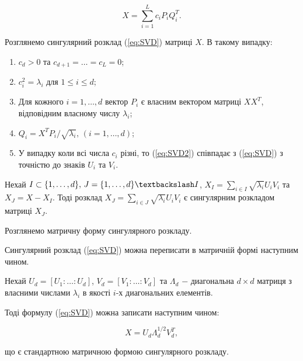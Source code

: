 \begin{equation}\label{eq:SVD2}
X = \sum_{i=1}^{L}c_{i}P_{i}Q_{i}^{T}.
\end{equation}

\vspace{1.5em}

Розглянемо сингулярний розклад (\ref{eq:SVD}) матриці $X$. В такому випадку:

\begin{enumerate}
	\item $c_{d} > 0$ та $c_{d+1} = \dots = c_{L} = 0$;
	\item $c_{i}^{2} = \lambda_{i}$ для $1 \le i \le d$;
	\item Для кожного $i = 1, \dots, d$ вектор $P_{i}$ є власним вектором матриці\newline
\hspace*{-18mm}$XX^{T}$, відповідним власному числу $\lambda_{i}$;
	\item $Q_{i} = X^{T}P_{i}/\sqrt{\lambda_{i}}, \, (i=1, \dots, d)$;
	\item У випадку коли всі числа $c_{i}$ різні, то (\ref{eq:SVD2}) співпадає з (\ref{eq:SVD}) з\newline 
\hspace*{-18mm}точністю до знаків $U_{i}$ та $V_{i}$.
\end{enumerate}

Нехай $I \subset \{1, \dots, d\}, \, J=\{1, \dots, d\} \textbackslash I$, $X_{I} = \sum_{i \in I}\sqrt{\lambda_{i}}U_{i}V_{i}$ та $X_{J} = X - X_{I}$. Тоді розклад $X_{J} = \sum_{i \in J}\sqrt{\lambda_{i}}U_{i}V_{i}$ є сингулярним розкладом матриці $X_{J}$.

Розглянемо матричну форму сингулярного розкладу.

Сингулярний розклад (\ref{eq:SVD}) можна переписати в матричній формі наступним чином.

Нехай $U_{d} = \left[ U_{1} : \dots : U_{d} \right]$, $V_{d} = \left[ V_{1} : \dots : V_{d}\right]$ та $\Lambda_{d}$ $-$ диагональна $d \times d$ матриця з власними числами $\lambda_{i}$ в якості $i$-х диагональних елементів.

Тоді формулу (\ref{eq:SVD}) можна записати наступним чином:

\begin{equation}\label{eq:SVDMatrix}
X = U_{d}\Lambda_{d}^{1/2}V_{d}^{T},
\end{equation}

\noindent що є стандартною матричною формою сингулярного розкладу.

